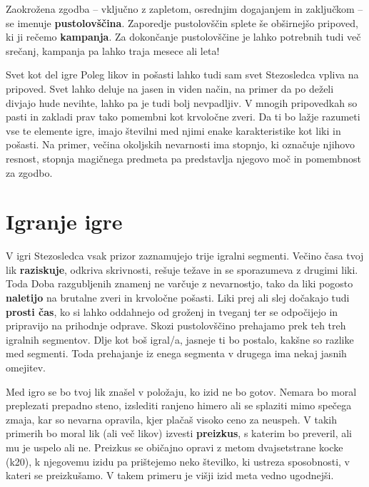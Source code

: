 Zaokrožena zgodba -- vključno z zapletom, osrednjim dogajanjem in zaključkom -- se imenuje \textbf{pustolovščina}. Zaporedje pustolovščin splete še obširnejšo pripoved, ki ji rečemo \textbf{kampanja}. Za dokončanje pustolovščine je lahko potrebnih tudi več srečanj, kampanja pa lahko traja mesece ali leta!

\begin{rpg-titlebox}{Svet kot del igre}
    Poleg likov in pošasti lahko tudi sam svet Stezosledca vpliva na pripoved. Svet lahko deluje na jasen in viden način, na primer da po deželi divjajo hude nevihte, lahko pa je tudi bolj nevpadljiv. V mnogih pripovedkah so pasti in zakladi prav tako pomembni kot krvoločne zveri. Da ti bo lažje razumeti vse te elemente igre, imajo številni med njimi enake karakteristike kot liki in pošasti. Na primer, večina okoljskih nevarnosti ima stopnjo, ki označuje njihovo resnost, stopnja magičnega predmeta pa predstavlja njegovo moč in pomembnost za zgodbo.
\end{rpg-titlebox}

\section{Igranje igre}

V igri Stezosledca vsak prizor zaznamujejo trije igralni segmenti. Večino časa tvoj lik \textbf{raziskuje}, odkriva skrivnosti, rešuje težave in se sporazumeva z drugimi liki. Toda Doba razgubljenih znamenj ne varčuje z nevarnostjo, tako da liki pogosto \textbf{naletijo} na brutalne zveri in krvoločne pošasti. Liki prej ali slej dočakajo tudi \textbf{prosti čas}, ko si lahko oddahnejo od groženj in tveganj ter se odpočijejo in pripravijo na prihodnje odprave. Skozi pustolovščino prehajamo prek teh treh igralnih segmentov. Dlje kot boš igral/a, jasneje ti bo postalo, kakšne so razlike med segmenti. Toda prehajanje iz enega segmenta v drugega ima nekaj jasnih omejitev.

Med igro se bo tvoj lik znašel v položaju, ko izid ne bo gotov. Nemara bo moral preplezati prepadno steno, izslediti ranjeno himero ali se splaziti mimo spečega zmaja, kar so nevarna opravila, kjer plačaš visoko ceno za neuspeh. V takih primerih bo moral lik (ali več likov) izvesti \textbf{preizkus}, s katerim bo preveril, ali mu je uspelo ali ne. Preizkus se običajno opravi z metom dvajsetstrane kocke (k20), k njegovemu izidu pa prištejemo neko številko, ki ustreza sposobnosti, v kateri se preizkušamo. V takem primeru je višji izid meta vedno ugodnejši.

